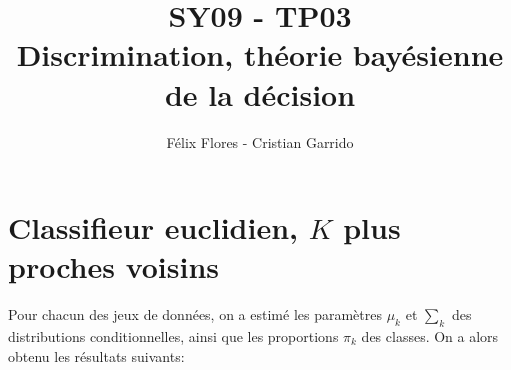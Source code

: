 \documentclass[a4paper,11pt]{article}
\title{SY09 - TP03\\Discrimination, théorie bayésienne de la décision}
\author{Félix Flores - Cristian Garrido}
\begin{document}
\maketitle

\section{Classifieur euclidien, $K$ plus proches voisins}

Pour chacun des jeux de données, on a estimé les paramètres $ \mu_k $ et $ \sum_k $ des distributions conditionnelles,
ainsi que les proportions $\pi_k$ des classes. On a alors obtenu les résultats suivants:
\end{document}
